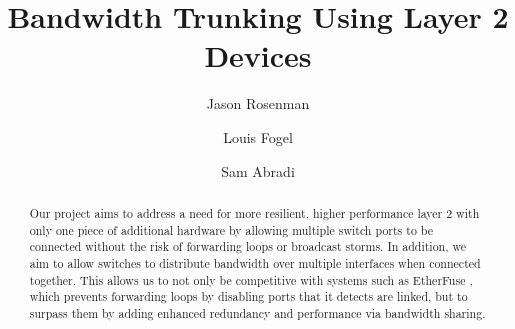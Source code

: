 \documentclass{article}
\title{Bandwidth Trunking Using Layer 2 Devices}
\author{Jason Rosenman \and Louis Fogel \and Sam Abradi}
\date{}
\begin{document}
\maketitle
\begin{abstract}
	Our project aims to address a need for more resilient, higher performance layer 2 with only one piece of additional hardware by allowing multiple switch ports to be connected without the risk of forwarding loops or broadcast storms.
	In addition, we aim to allow switches to distribute bandwidth over multiple interfaces when connected together.
	This allows us to not only be competitive with systems such as EtherFuse \cite{etherfuse}, which prevents forwarding loops by disabling ports that it detects are linked, but to surpass them by adding enhanced redundancy and performance via bandwidth sharing.
\end{abstract}




\newpage


\end{document}
